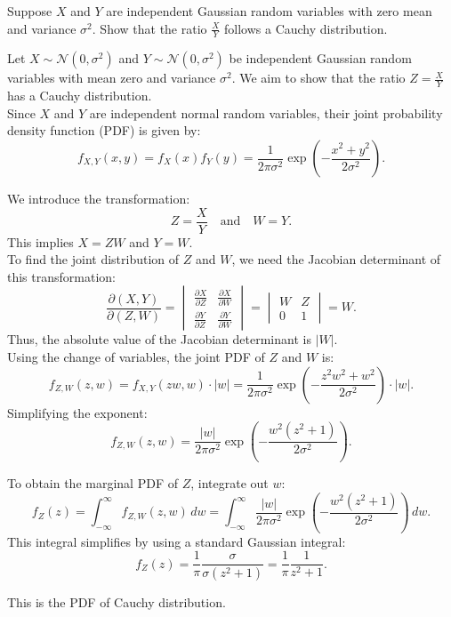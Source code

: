\begin{exercise}
Suppose \( X \) and \( Y \) are independent Gaussian random variables with zero mean and variance \( \sigma^2 \). Show that the ratio \( \frac{X}{Y} \) follows a Cauchy distribution.
\end{exercise}

\begin{solution}
Let \( X \sim \mathcal{N}(0, \sigma^2) \) and \( Y \sim \mathcal{N}(0, \sigma^2) \) be independent Gaussian random variables with mean zero and variance \( \sigma^2 \). We aim to show that the ratio \( Z = \frac{X}{Y} \) has a Cauchy distribution.\\

Since \( X \) and \( Y \) are independent normal random variables, their joint probability density function (PDF) is given by:
\[
f_{X,Y}(x, y) = f_X(x) f_Y(y) = \frac{1}{2 \pi \sigma^2} \exp \left( -\frac{x^2 + y^2}{2 \sigma^2} \right).
\]

We introduce the transformation:
\[
Z = \frac{X}{Y} \quad \text{and} \quad W = Y.
\]
This implies \( X = ZW \) and \( Y = W \).\\

To find the joint distribution of \( Z \) and \( W \), we need the Jacobian determinant of this transformation:
\[
\frac{\partial (X, Y)}{\partial (Z, W)} = 
\begin{vmatrix}
\frac{\partial X}{\partial Z} & \frac{\partial X}{\partial W} \\
\frac{\partial Y}{\partial Z} & \frac{\partial Y}{\partial W}
\end{vmatrix} = 
\begin{vmatrix}
W & Z \\
0 & 1
\end{vmatrix} = W.
\]
Thus, the absolute value of the Jacobian determinant is \( |W| \).\\

Using the change of variables, the joint PDF of \( Z \) and \( W \) is:
\[
f_{Z, W}(z, w) = f_{X,Y}(z w, w) \cdot |w| = \frac{1}{2 \pi \sigma^2} \exp \left( -\frac{z^2 w^2 + w^2}{2 \sigma^2} \right) \cdot |w|.
\]
Simplifying the exponent:
\[
f_{Z, W}(z, w) = \frac{|w|}{2 \pi \sigma^2} \exp \left( -\frac{w^2 (z^2 + 1)}{2 \sigma^2} \right).
\]

To obtain the marginal PDF of \( Z \), integrate out \( w \):
\[
f_Z(z) = \int_{-\infty}^{\infty} f_{Z, W}(z, w) \, dw = \int_{-\infty}^{\infty} \frac{|w|}{2 \pi \sigma^2} \exp \left( -\frac{w^2 (z^2 + 1)}{2 \sigma^2} \right) \, dw.
\]
This integral simplifies by using a standard Gaussian integral:
\[
f_Z(z) = \frac{1}{\pi} \frac{\sigma}{\sigma (z^2 + 1)} = \frac{1}{\pi} \frac{1}{z^2 + 1}.
\]

This is the PDF of Cauchy distribution. 
\end{solution}


